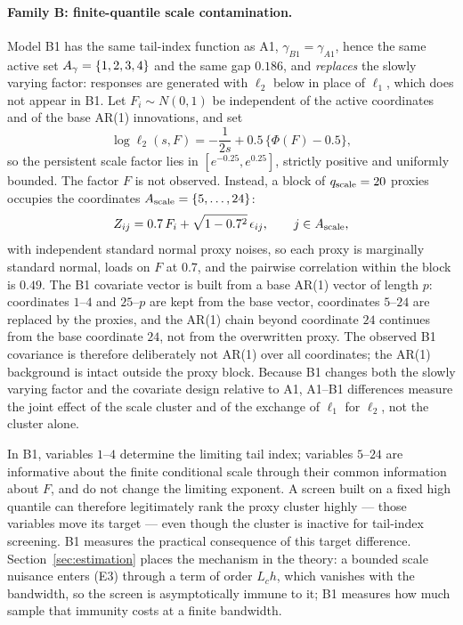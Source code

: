 \paragraph{Family B: finite-quantile scale contamination.}
Model B1 has the same tail-index function as A1,
$\gamma_{B1}=\gamma_{A1}$, hence the same active set
$A_\gamma=\{1,2,3,4\}$ and the same gap $0.186$, and \emph{replaces}
the slowly varying factor: responses are generated with $\ell_2$ below
in place of $\ell_1$, which does not appear in B1. Let
$F_i\sim N(0,1)$ be independent of the active coordinates and of the
base AR(1) innovations, and set
\[
 \log\ell_2(s,F)=-\frac1{2s}+0.5\,\bigl\{\Phi(F)-0.5\bigr\},
\]
so the persistent scale factor lies in $[e^{-0.25},e^{0.25}]$, strictly
positive and uniformly bounded. The factor $F$ is not observed. Instead,
a block of $q_{\rm scale}=20$ proxies occupies the coordinates
$A_{\rm scale}=\{5,\ldots,24\}$:
\[
 Z_{ij}=0.7\,F_i+\sqrt{1-0.7^2}\,\epsilon_{ij},
 \qquad j\in A_{\rm scale},
\]
with independent standard normal proxy noises, so each proxy is
marginally standard normal, loads on $F$ at $0.7$, and the pairwise
correlation within the block is $0.49$. The B1 covariate vector is
built from a base AR(1) vector of length $p$: coordinates $1$--$4$ and
$25$--$p$ are kept from the base vector, coordinates $5$--$24$ are
replaced by the proxies, and the AR(1) chain beyond coordinate $24$
continues from the base coordinate $24$, not from the overwritten
proxy. The observed B1 covariance is therefore deliberately not AR(1)
over all coordinates; the AR(1) background is intact outside the proxy
block. Because B1 changes both the slowly varying factor and the
covariate design relative to A1, A1--B1 differences measure the joint
effect of the scale cluster and of the exchange of $\ell_1$ for
$\ell_2$, not the cluster alone.

In B1, variables $1$--$4$ determine the limiting tail index; variables
$5$--$24$ are informative about the finite conditional scale through
their common information about $F$, and do not change the limiting
exponent. A screen built on a fixed high quantile can therefore
legitimately rank the proxy cluster highly --- those variables move its
target --- even though the cluster is inactive for tail-index
screening. B1 measures the practical consequence of this target
difference. Section~\ref{sec:estimation} places the mechanism in the
theory: a bounded scale nuisance enters (E3) through a term of order
$L_ch$, which vanishes with the bandwidth, so the screen is
asymptotically immune to it; B1 measures how much sample that immunity
costs at a finite bandwidth.

